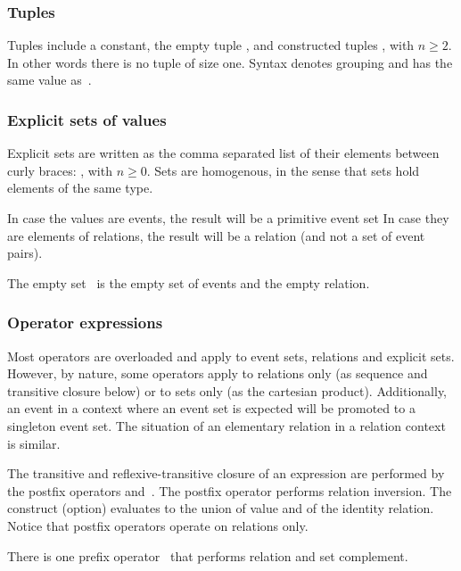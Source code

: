 \subsubsection*{Tuples}
Tuples include a constant, the empty tuple \synt{\T{(}\T{)}},
and constructed tuples
,
with $n \geq 2$. In other words there is no tuple of size one.
Syntax  denotes grouping and has the same
value as~.


\subsubsection*{Explicit sets of values}
Explicit sets are written as the comma separated
list of their elements between curly braces:
,
with $n \geq 0$.
Sets are homogenous, in the sense that sets hold elements of the same type.

In case the values  are events, the result will be a primitive event set
In case they are elements of relations, the result
will be a relation (and not a set of event pairs).

The empty set~\synt{\T{\{}\T{\}}} is the empty set of events and the empty relation.



\subsubsection*{Operator expressions}
Most operators are overloaded and apply to event sets, relations and explicit sets.
However, by nature, some operators apply to relations only (as sequence and transitive closure
below) or to sets only (as the cartesian product). Additionally, an event in a context where
an event set is expected will be promoted to a singleton event set. The situation of an
elementary relation in a relation context is similar.

The transitive and reflexive-transitive closure of an expression are performed
by the postfix operators \T{+} and~\T{*}.
The  postfix operator  performs relation inversion.
The construct  (option) evaluates to the union
of   value and of the identity relation.
Notice that postfix operators operate on relations only.

There is one prefix operator~\T{\textasciitilde} that performs
relation and set complement.

